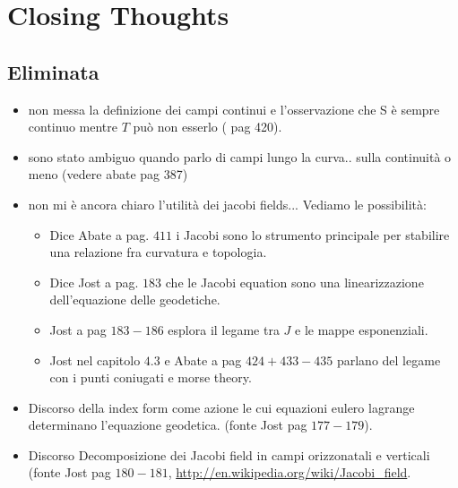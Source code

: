 \documentclass[a4paper,12pt]{scrartcl}    %
\begin{document}




\newpage
\section{Closing Thoughts}

\subsection{Eliminata}
\begin{itemize}

\item non messa la definizione dei campi continui e l'osservazione che S  è sempre continuo mentre $T$ può non esserlo (\cite{Abate2011} pag 420).

\item sono stato ambiguo quando parlo di campi lungo la curva.. sulla continuità o meno (vedere abate pag 387)

\item non mi è ancora chiaro l'utilità dei jacobi fields... Vediamo le possibilità:
	\begin{itemize}
	\item Dice Abate a pag. $411$ i Jacobi sono lo strumento principale per stabilire una relazione fra curvatura e topologia.
	\item Dice Jost a pag. $183$ che le Jacobi equation sono una linearizzazione dell'equazione delle geodetiche.
	\item Jost a pag $183-186$ esplora il legame tra $J$  e le mappe esponenziali.
	\item Jost nel capitolo $4.3$ e  Abate a pag $424 + 433-435$ parlano del legame con i punti coniugati e morse theory.
	\end{itemize}

\item Discorso della index form come azione le cui equazioni eulero lagrange determinano l'equazione geodetica. (fonte Jost pag $177-179$).

\item Discorso Decomposizione dei Jacobi field in campi orizzonatali e verticali (fonte Jost pag $180-181$, \url{http://en.wikipedia.org/wiki/Jacobi_field}.


\end{itemize}



\end{document}
